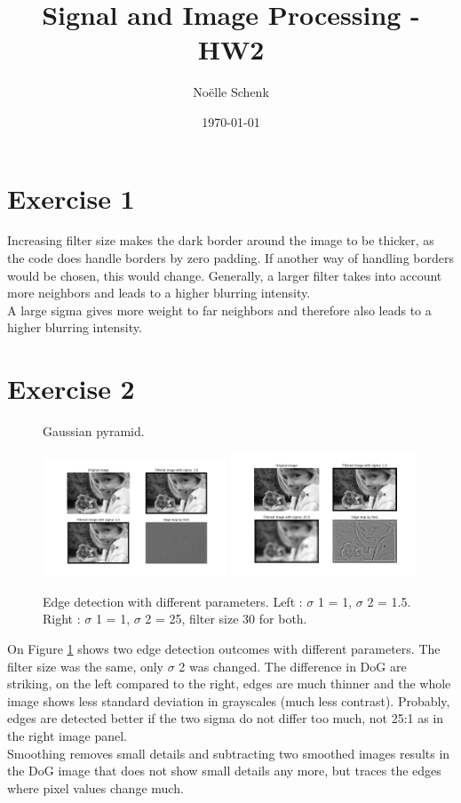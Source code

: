 \documentclass[a4paper,8pt]{extarticle}\usepackage[]{graphicx}\usepackage[]{color}
\title{Signal and Image Processing - HW2}
\author{Noëlle Schenk}
\date{\today}
\begin{document}
\maketitle
\section{Exercise 1}
Increasing filter size makes the dark border around the image to be thicker, as the code does handle borders by zero padding. If another way of handling borders would be chosen, this would change. Generally, a larger filter takes into account more neighbors and leads to a higher blurring intensity. \\
A large sigma gives more weight to far neighbors and therefore also leads to a higher blurring intensity.

\section{Exercise 2}
\begin{figure}
  \caption{Gaussian pyramid.}
  \centering
    \includegraphics[width=0.49\textwidth]{figs/ex2_1.png}
    \includegraphics[width=0.49\textwidth]{figs/ex2_2.png}
  \label{fig:edges}
  \caption{Edge detection with different parameters. Left : $\sigma$ 1 = 1, $\sigma$ 2 = 1.5. Right : $\sigma$ 1 = 1, $\sigma$ 2 = 25, filter size 30 for both.}
\end{figure}

On Figure \ref{fig:edges} shows two edge detection outcomes with different parameters. The filter size was the same, only $\sigma$ 2 was changed. The difference in DoG are striking, on the left compared to the right, edges are much thinner and the whole image shows less standard deviation in grayscales (much less contrast). Probably, edges are detected better if the two sigma do not differ too much, not 25:1 as in the right image panel. \\
Smoothing removes small details and subtracting two smoothed images results in the DoG image that does not show small details any more, but traces the edges where pixel values change much. 
\end{document}
